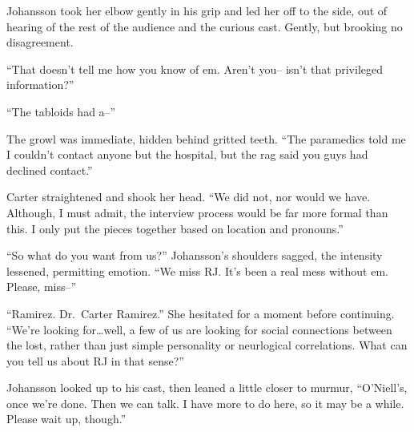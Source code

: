 Johansson took her elbow gently in his grip and led her off to the side, out of hearing of the rest of the audience and the curious cast. Gently, but brooking no disagreement.

``That doesn't tell me how you know of em. Aren't you-- isn't that privileged information?''

``The tabloids had a--''

The growl was immediate, hidden behind gritted teeth. ``The paramedics told me I couldn't contact anyone but the hospital, but the rag said you guys had declined contact.''

Carter straightened and shook her head. ``We did not, nor would we have. Although, I must admit, the interview process would be far more formal than this. I only put the pieces together based on location and pronouns.''

``So what do you want from us?'' Johansson's shoulders sagged, the intensity lessened, permitting emotion. ``We miss RJ. It's been a real mess without em. Please, miss--''

``Ramirez. Dr.~Carter Ramirez.'' She hesitated for a moment before continuing. ``We're looking for\ldots{}well, a few of us are looking for social connections between the lost, rather than just simple personality or neurlogical correlations. What can you tell us about RJ in that sense?''

Johansson looked up to his cast, then leaned a little closer to murmur, ``O'Niell's, once we're done. Then we can talk. I have more to do here, so it may be a while. Please wait up, though.''
